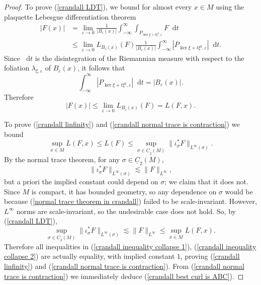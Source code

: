 \documentclass[reqno,11pt]{amsart}
\newcommand*\dif{\mathop{}\!\mathrm{d}}
\newcommand{\Chain}{\underline C}
\theoremstyle{definition}
\numberwithin{equation}{section}
\begin{document}
\begin{proof}
To prove (\ref{crandall LDT}), we bound for almost every $x \in M$ using the plaquette Lebesgue differentiation theorem
\begin{align*}
|F(x)|
&= \lim_{\varepsilon \to 0} \frac{1}{|B_\varepsilon(x)|} \int_{-\infty}^\infty \int_{P_{\ker \xi + t\xi^\sharp, \varepsilon}} F \dif t \\
&\leq \lim_{\varepsilon \to 0} L_{B_\varepsilon(x)}(F) \frac{1}{|B_\varepsilon(x)|} \int_{-\infty}^\infty |P_{\ker \xi + t\xi^\sharp, \varepsilon}| \dif t.
\end{align*}
Since $\dif t$ is the disintegration of the Riemannian measure with respect to the foliation $\lambda_{\xi, \varepsilon}$ of $B_\varepsilon(x)$,  it follows that 
$$\int_{-\infty}^\infty |P_{\ker \xi + t\xi^\sharp, \varepsilon}| \dif t = |B_\varepsilon(x)|.$$
Therefore
$$|F(x)| \leq \lim_{\varepsilon \to 0} L_{B_\varepsilon(x)}(F) = L(F, x).$$

To prove (\ref{crandall linfinity}) and (\ref{crandall normal trace is contraction}) we bound 
\begin{equation}\label{crandall inequality collapse 1}
\sup_{x \in M} L(F, x) \leq L(F) \leq \sup_{\sigma \in \Chain_2(M)} \|\iota_\sigma^* F\|_{L^\infty(\sigma)}.
\end{equation}
By the normal trace theorem, for any $\sigma \in \Chain_2(M)$,
\begin{equation}\label{normal trace theorem in crandall}
\|\iota_\sigma^* F\|_{L^\infty(\sigma)} \lesssim \|F\|_{L^\infty},
\end{equation}
but a priori the implied constant could depend on $\sigma$; we claim that it does not.
Since $M$ is compact, it has bounded geometry, so any dependence on $\sigma$ would be because (\ref{normal trace theorem in crandall}) failed to be scale-invariant.
However, $L^\infty$ norms are scale-invariant, so the undesirable case does not hold.
So, by (\ref{crandall LDT}),
\begin{equation}\label{crandall inequality collapse 2}
\sup_{\sigma \in \Chain_2(M)} \|\iota_\sigma^* F\|_{L^\infty(\sigma)} \lesssim \|F\|_{L^\infty} \leq \sup_{x \in M} L(F, x).
\end{equation}
Therefore all inequalities in (\ref{crandall inequality collapse 1}), (\ref{crandall inequality collapse 2}) are actually equality, with implied constant $1$, proving (\ref{crandall linfinity}) and (\ref{crandall normal trace is contraction}).
From (\ref{crandall normal trace is contraction}) we immediately deduce (\ref{crandall best curl is ABC}).
\end{proof}
\end{document}
